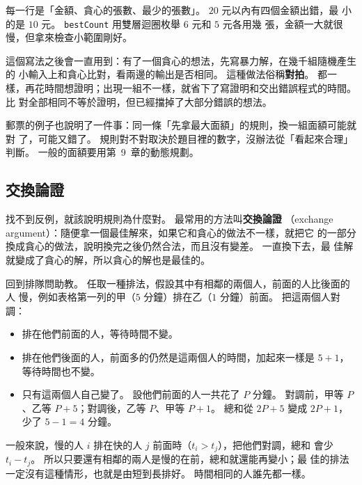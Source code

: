 
每一行是「金額、貪心的張數、最少的張數」。 $20$ 元以內有四個金額出錯，最
小的是 $10$ 元。 \texttt{bestCount} 用雙層迴圈枚舉 $6$ 元和 $5$ 元各用幾
張，金額一大就很慢，但拿來檢查小範圍剛好。

這個寫法之後會一直用到：有了一個貪心的想法，先寫暴力解，在幾千組隨機產生的
小輸入上和貪心比對，看兩邊的輸出是否相同。 這種做法俗稱\textbf{對拍}。 都一
樣，再花時間想證明；出現一組不一樣，就省下了寫證明和交出錯誤程式的時間。 比
對全部相同不等於證明，但已經擋掉了大部分錯誤的想法。

郵票的例子也說明了一件事：同一條「先拿最大面額」的規則，換一組面額可能就對
了，可能又錯了。 規則對不對取決於題目裡的數字，沒辦法從「看起來合理」判斷。
一般的面額要用第~9~章的動態規劃。

\subsection{交換論證}
\label{sec:exchange}

找不到反例，就該說明規則為什麼對。 最常用的方法叫\textbf{交換論證}
（exchange argument）：隨便拿一個最佳解來，如果它和貪心的做法不一樣，就把它
的一部分換成貪心的做法，說明換完之後仍然合法，而且沒有變差。 一直換下去，最
佳解就變成了貪心的解，所以貪心的解也是最佳的。

回到排隊問助教。 任取一種排法，假設其中有相鄰的兩個人，前面的人比後面的人
慢，例如表格第一列的甲（$5$ 分鐘）排在乙（$1$ 分鐘）前面。 把這兩個人對調：

\begin{itemize}
\item 排在他們前面的人，等待時間不變。
\item 排在他們後面的人，前面多的仍然是這兩個人的時間，加起來一樣是 $5 + 1$，
等待時間也不變。
\item 只有這兩個人自己變了。 設他們前面的人一共花了 $P$ 分鐘。 對調前，甲等
$P$、乙等 $P + 5$；對調後，乙等 $P$、甲等 $P + 1$。 總和從 $2P + 5$ 變成
$2P + 1$，少了 $5 - 1 = 4$ 分鐘。
\end{itemize}

一般來說，慢的人 $i$ 排在快的人 $j$ 前面時（$t_i > t_j$），把他們對調，總和
會少 $t_i - t_j$。 所以只要還有相鄰的兩人是慢的在前，總和就還能再變小；最
佳的排法一定沒有這種情形，也就是由短到長排好。 時間相同的人誰先都一樣。

